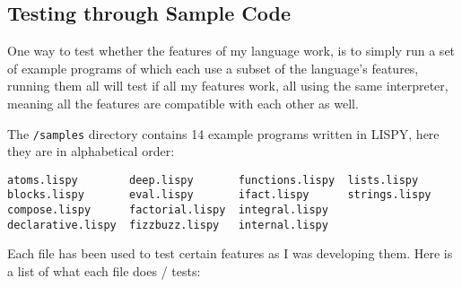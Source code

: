 \documentclass{article}
\newcommand{\code}[1]{\texttt{#1}}
\begin{document}
  \subsection{Testing through Sample Code}
    One way to test whether the features of my language work, is to simply
    run a set of example programs of which each use a subset of the language's
    features, running them all will test if all my features work, all using the
    same interpreter, meaning all the features are compatible with each other
    as well.

    The \code{/samples} directory contains 14 example programs written
    in LISPY, here they are in alphabetical order:
    \begin{Verbatim}
atoms.lispy        deep.lispy       functions.lispy  lists.lispy
blocks.lispy       eval.lispy       ifact.lispy      strings.lispy
compose.lispy      factorial.lispy  integral.lispy
declarative.lispy  fizzbuzz.lispy   internal.lispy
    \end{Verbatim}

    Each file has been used to test certain features as I was developing them.
    Here is a list of what each file does / tests:
\end{document}
